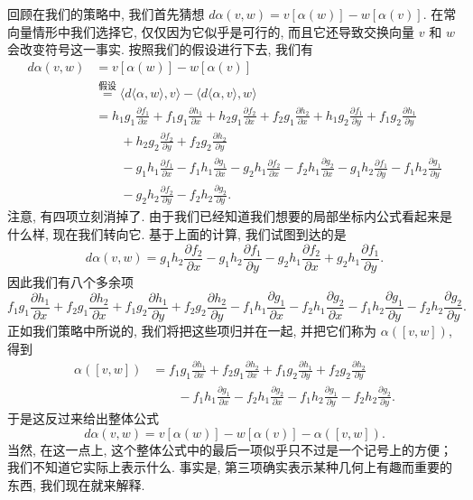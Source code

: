 回顾在我们的策略中, 我们首先猜想 $d\alpha(v,w)=v[\alpha(w)]-w[\alpha(v)]$. 在常向量情形中我们选择它, 仅仅因为它似乎是可行的, 而且它还导致交换向量 $v$ 和 $w$ 会改变符号这一事实. 按照我们的假设进行下去, 我们有
\begin{align*}
d\alpha(v,w)&=v[\alpha(w)]-w[\alpha(v)]\\
&\overset{\text{假设}}{=}\bigl\langle d\langle\alpha,w\rangle,v\bigr\rangle-\bigl\langle d\langle\alpha,v\rangle,w\bigr\rangle\\
&=h_1g_1\frac{\partial f_1}{\partial x}+f_1g_1\frac{\partial h_1}{\partial x}
+h_2g_1\frac{\partial f_2}{\partial x}+f_2g_1\frac{\partial h_2}{\partial x}
+h_1g_2\frac{\partial f_1}{\partial y}+f_1g_2\frac{\partial h_1}{\partial y}\\
&\qquad+h_2g_2\frac{\partial f_2}{\partial y}+f_2g_2\frac{\partial h_2}{\partial y}\\
&\qquad-g_1h_1\frac{\partial f_1}{\partial x}-f_1h_1\frac{\partial g_1}{\partial x}
-g_2h_1\frac{\partial f_2}{\partial x}-f_2h_1\frac{\partial g_2}{\partial x}
-g_1h_2\frac{\partial f_1}{\partial y}-f_1h_2\frac{\partial g_1}{\partial y}\\
&\qquad-g_2h_2\frac{\partial f_2}{\partial y}-f_2h_2\frac{\partial g_2}{\partial y}.
\end{align*}
注意, 有四项立刻消掉了. 由于我们已经知道我们想要的局部坐标内公式看起来是什么样, 现在我们转向它. 基于上面的计算, 我们试图到达的是
\[
d\alpha(v,w)=g_1h_2\frac{\partial f_2}{\partial x}-g_1h_2\frac{\partial f_1}{\partial y}
-g_2h_1\frac{\partial f_2}{\partial x}+g_2h_1\frac{\partial f_1}{\partial y}.
\]
因此我们有八个多余项
\[
f_1g_1\frac{\partial h_1}{\partial x}+f_2g_1\frac{\partial h_2}{\partial x}
+f_1g_2\frac{\partial h_1}{\partial y}+f_2g_2\frac{\partial h_2}{\partial y}
-f_1h_1\frac{\partial g_1}{\partial x}-f_2h_1\frac{\partial g_2}{\partial x}
-f_1h_2\frac{\partial g_1}{\partial y}-f_2h_2\frac{\partial g_2}{\partial y}.
\]
正如我们策略中所说的, 我们将把这些项归并在一起, 并把它们称为 $\alpha([v,w])$, 得到
\[
\begin{aligned}
\alpha([v,w])&=f_1g_1\frac{\partial h_1}{\partial x}+f_2g_1\frac{\partial h_2}{\partial x}
+f_1g_2\frac{\partial h_1}{\partial y}+f_2g_2\frac{\partial h_2}{\partial y}\\
&\qquad-f_1h_1\frac{\partial g_1}{\partial x}-f_2h_1\frac{\partial g_2}{\partial x}
-f_1h_2\frac{\partial g_1}{\partial y}-f_2h_2\frac{\partial g_2}{\partial y}.
\end{aligned}
\]
于是这反过来给出整体公式
\[
d\alpha(v,w)=v[\alpha(w)]-w[\alpha(v)]-\alpha([v,w]).
\]
当然, 在这一点上, 这个整体公式中的最后一项似乎只不过是一个记号上的方便；我们不知道它实际上表示什么. 事实是, 第三项确实表示某种几何上有趣而重要的东西, 我们现在就来解释.

